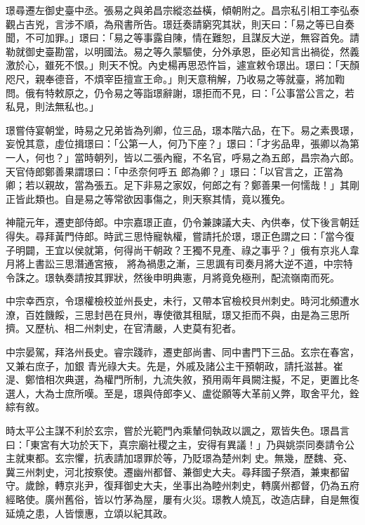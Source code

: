 \begin{pinyinscope}
 璟尋遷左御史臺中丞。張易之與弟昌宗縱恣益橫，傾朝附之。昌宗私引相工李弘泰觀占吉兇，言涉不順，為飛書所告。璟廷奏請窮究其狀，則天曰：「易之等已自奏聞，不可加罪。」璟曰：「易之等事露自陳，情在難恕，且謀反大逆，無容首免。請勒就御史臺勘當，以明國法。易之等久蒙驅使，分外承恩，臣必知言出禍從，然義激於心，雖死不恨。」則天不悅。內史楊再思恐忤旨，遽宣敕令璟出。璟曰：「天顏
 咫尺，親奉德音，不煩宰臣擅宣王命。」則天意稍解，乃收易之等就臺，將加鞫問。俄有特敕原之，仍令易之等詣璟辭謝，璟拒而不見，曰：「公事當公言之，若私見，則法無私也。」



 璟嘗侍宴朝堂，時易之兄弟皆為列卿，位三品，璟本階六品，在下。易之素畏璟，妄悅其意，虛位揖璟曰：「公第一人，何乃下座？」璟曰：「才劣品卑，張卿以為第一人，何也？」當時朝列，皆以二張內寵，不名官，呼易之為五郎，昌宗為六郎。天官侍郎鄭善果謂璟曰：「中丞奈何呼五
 郎為卿？」璟曰：「以官言之，正當為卿；若以親故，當為張五。足下非易之家奴，何郎之有？鄭善果一何懦哉！」其剛正皆此類也。自是易之等常欲因事傷之，則天察其情，竟以獲免。



 神龍元年，遷吏部侍郎。中宗嘉璟正直，仍令兼諫議大夫、內供奉，仗下後言朝廷得失。尋拜黃門侍郎。時武三思恃寵執權，嘗請托於璟，璟正色謂之曰：「當今復子明闢，王宜以侯就第，何得尚干朝政？王獨不見產、祿之事乎？」俄有京兆人韋月將上書訟三思潛通宮掖，
 將為禍患之漸，三思諷有司奏月將大逆不道，中宗特令誅之。璟執奏請按其罪狀，然後申明典憲，月將竟免極刑，配流嶺南而死。



 中宗幸西京，令璟權檢校並州長史，未行，又帶本官檢校貝州刺史。時河北頻遭水潦，百姓饑餒，三思封邑在貝州，專使徵其租賦，璟又拒而不與，由是為三思所擠。又歷杭、相二州刺史，在官清嚴，人吏莫有犯者。



 中宗晏駕，拜洛州長史。睿宗踐祚，遷吏部尚書、同中書門下三品。玄宗在春宮，又兼右庶子，加銀
 青光祿大夫。先是，外戚及諸公主干預朝政，請托滋甚。崔湜、鄭愔相次典選，為權門所制，九流失敘，預用兩年員闕注擬，不足，更置比冬選人，大為士庶所嘆。至是，璟與侍郎李乂、盧從願等大革前乂弊，取舍平允，銓綜有敘。



 時太平公主謀不利於玄宗，嘗於光範門內乘輦伺執政以諷之，眾皆失色。璟昌言曰：「東宮有大功於天下，真宗廟社稷之主，安得有異議！」乃與姚崇同奏請令公主就東都。玄宗懼，抗表請加璟罪於等，乃貶璟為楚州刺
 史。無幾，歷魏、兗、冀三州刺史，河北按察使。遷幽州都督、兼御史大夫。尋拜國子祭酒，兼東都留守。歲餘，轉京兆尹，復拜御史大夫，坐事出為睦州刺史，轉廣州都督，仍為五府經略使。廣州舊俗，皆以竹茅為屋，屢有火災。璟教人燒瓦，改造店肆，自是無復延燒之患，人皆懷惠，立頌以紀其政。




\end{pinyinscope}
